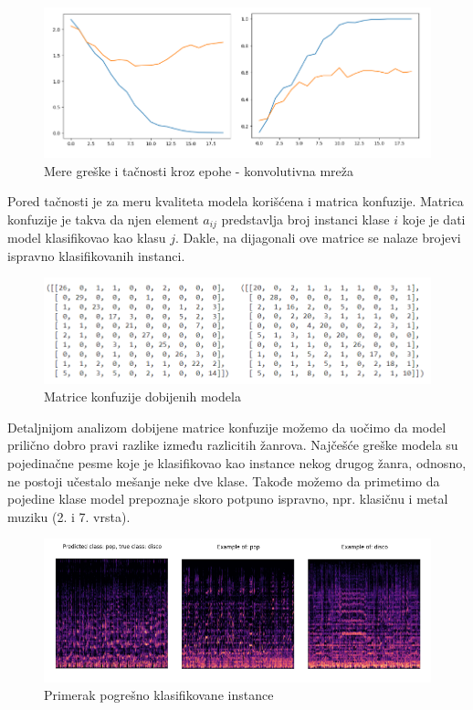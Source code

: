 \documentclass{article}
\begin{document}
\begin{figure}[h]
\centering
\includegraphics[scale=0.75]{CNN-history}
\caption{Mere greške i tačnosti kroz epohe - konvolutivna mreža}
\end{figure}


Pored tačnosti je za meru kvaliteta modela korišćena i matrica konfuzije. Matrica konfuzije je takva da njen element $a_{ij}$ predstavlja broj instanci klase $i$ koje je dati model klasifikovao kao klasu $j$. Dakle, na dijagonali ove matrice se nalaze brojevi ispravno klasifikovanih instanci.

\begin{figure}[h]
\centering
\includegraphics[scale=0.8]{matrix}
\caption{Matrice konfuzije dobijenih modela}
\end{figure}

Detaljnijom analizom dobijene matrice konfuzije možemo da uočimo da model prilično dobro pravi razlike između razlicitih žanrova. Najčešće greške modela su pojedinačne pesme koje je klasifikovao kao instance nekog drugog žanra, odnosno, ne postoji učestalo mešanje neke dve klase. Takođe možemo da primetimo da pojedine klase model prepoznaje skoro potpuno ispravno, npr. klasičnu i metal muziku (2. i 7. vrsta).

\begin{figure}[h]
\centering
\includegraphics[scale=0.8]{misclassified}
\caption{Primerak pogrešno klasifikovane instance}
\end{figure}
\end{document}
